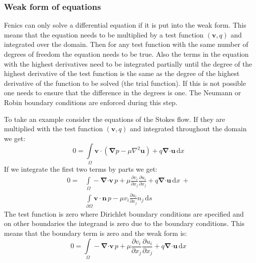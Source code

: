 \documentclass[12pt, a4paper]{article}
\begin{document}
        \subsubsection{Weak form of equations}
            Fenics can only solve a differential equation if it is put into the weak form. This means that the equation needs to be multiplied by a test function $(\mathbf{v}, q)$ and integrated over the domain. Then for any test function with the same number of degrees of freedom the equation needs to be true. Also the terms in the equation with the highest derivatives need to be integrated partially until the degree of the highest derivative of the test function is the same as the degree of the highest derivative of the function to be solved (the trial function). If this is not possible one needs to ensure that the difference in the degrees is one. The Neumann or Robin boundary conditions are enforced during this step.
            
            To take an example consider the equations of the Stokes flow. If they are multiplied with the test function $(\mathbf{v}, q)$ and integrated throughout the domain we get:
            \begin{equation}
                0 = \int\limits_{\Omega}
                \mathbf{v \cdot} \left(
                    \boldsymbol{\nabla} p - \mu \nabla^2 \mathbf{u}
                \right) +
                q \boldsymbol{\nabla} \mathbf{\cdot u}
                \, \mathrm{d}x
            \end{equation}
            If we integrate the first two terms by parts we get:
            \begin{equation}
            \begin{split}
            0 = &\int\limits_{\Omega}
            - \boldsymbol{\nabla} \mathbf{\cdot v} \, p  +
            \mu \frac{\partial v_i}{\partial x_j} \frac{\partial u_i}{\partial x_j} +
            q \boldsymbol{\nabla} \mathbf{\cdot u}
            \, \mathrm{d}x \ + \\
            &\int\limits_{\partial \Omega}
            \mathbf{v \cdot n} \, p - 
            \mu v_i \frac{\partial u_i}{\partial x_j} n_j
            \, \mathrm{d}s
            \end{split}
            \end{equation}
            The test function is zero where Dirichlet boundary conditions are specified and on other boundaries the integrand is zero due to the boundary conditions. This means that the boundary term is zero and the weak form is:
            \begin{equation}
            0 = \int\limits_{\Omega}
            - \boldsymbol{\nabla} \mathbf{\cdot v} \, p  +
            \mu \frac{\partial v_i}{\partial x_j} \frac{\partial u_i}{\partial x_j} +
            q \boldsymbol{\nabla} \mathbf{\cdot u}
            \, \mathrm{d}x
            \end{equation}
            
\end{document}
